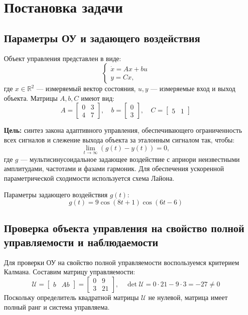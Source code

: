 \section{Постановка задачи}
\subsection{Параметры ОУ и задающего воздействия}
Объект управления представлен в виде:
\begin{equation}
\begin{cases}
    \dot{x}=Ax+bu \\
    y=Cx,
\end{cases}
\label{eq:plant}
\end{equation}
где $x\in\mathbb{R}^2$ --- измеряемый вектор состояния, $u,y$ --- измеряемые вход и выход объекта. Матрицы $A,b,C$ имеют вид:
\begin{equation}
A=
\begin{bmatrix}
    0 & 3 \\
    4 & 7
\end{bmatrix},\quad
b=
\begin{bmatrix}
    0\\
    3
\end{bmatrix},\quad
C=
\begin{bmatrix}
    5 & 1
\end{bmatrix}
\label{eq:matrices}
\end{equation}

\textbf{Цель:} синтез закона адаптивного управления, обеспечивающего ограниченность всех сигналов
и слежение выхода объекта за эталонным сигналом так, чтобы:
\begin{equation}
\lim_{t\to\infty}\left(g\left(t\right)-y\left(t\right)\right)=0,
\label{eq:tracking}
\end{equation}
где $g$ --- мультисинусоидальное задающее воздействие с априори неизвестными амплитудами, частотами и
фазами гармоник. Для обеспечения ускоренной параметрической сходимости используется схема Лайона.

Параметры задающего воздействия $g(t)$:
\begin{equation}
g(t)=9\cos\left(8t+1\right)\cos\left(6t-6\right)
\label{eq:reference}
\end{equation}

\subsection{Проверка объекта управления на свойство полной управляемости и 
наблюдаемости}
Для проверки ОУ на свойство полной управляемости воспользуемся критерием Калмана. Составим
матрицу управляемости:
$$
\mathcal{U}=
\begin{bmatrix}
    b & Ab
\end{bmatrix}=
\begin{bmatrix}
    0 & 9 \\
    3 & 21
\end{bmatrix},\quad
\operatorname{det}\mathcal{U}=0\cdot21-9\cdot3=-27\neq0
$$
Поскольку определитель квадратной матрицы $\mathcal{U}$ не нулевой, матрица имеет полный ранг
и система управляема.

